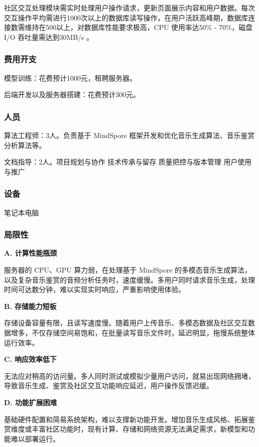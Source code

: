 \documentclass{base}
\numberwithin{figure}{section} %
\begin{document}
社区交互处理模块需实时处理用户操作请求，更新页面展示内容和用户数据。每次交互操作平均需进行1000次以上的数据库读写操作，在用户活跃高峰期，数据库连接数需维持在500以上，对数据库性能要求极高，CPU 使用率达50\% - 70\%，磁盘 I/O 吞吐量需达到30MB/s 。

\subsubsection{费用开支}

模型训练：花费预计1000元，租聘服务器。

后端开发以及服务器搭建：花费预计300元。

\subsubsection{人员}

算法工程师：3人。负责基于 MindSpore 框架开发和优化音乐生成算法、音乐鉴赏分析算法等。

文档指导：2人。项目规划与协作 技术传承与留存 质量把控与版本管理 用户使用与推广

\subsubsection{设备}

笔记本电脑

\subsubsection{局限性}

\textbf{A. 计算性能瓶颈​}

服务器的 CPU、GPU 算力弱，在处理基于 MindSpore 的多模态音乐生成算法，以及复杂音乐鉴赏的音频分析任务时，速度缓慢。多用户同时请求音乐生成，处理时间可达数分钟，难以实现实时响应，严重影响使用体验。​

\textbf{B. 存储能力短板​}

存储设备容量有限，且读写速度慢。随着用户上传音乐、多模态数据及社区交互数据增多，不仅存储空间易饱和，在批量读写音乐文件时，延迟明显，拖慢系统整体运行效率。

\textbf{C. 响应效率低下​}

无法应对稍高的访问量。多人同时测试或模拟少量用户访问，就易出现网络拥堵，导致音乐生成、鉴赏及社区交互功能响应延迟，用户操作反馈迟缓。​

\textbf{D. 功能扩展困难​}

基础硬件配置和简易系统架构，难以支撑新功能开发。增加音乐生成风格、拓展鉴赏维度或丰富社区功能时，现有计算、存储和网络资源无法满足需求，新模型和功能难以部署运行。
\end{document}
